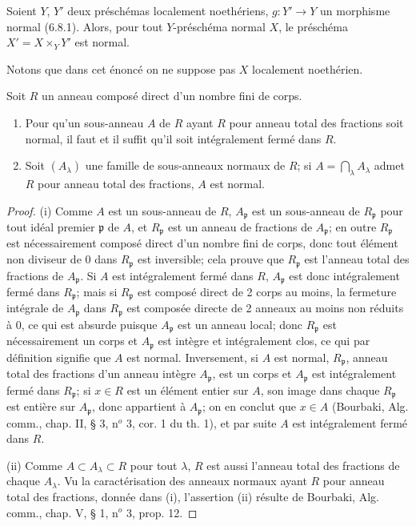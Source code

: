 \begin{proposition}[6.14.1]
\label{IV.2.s6.14.1-fr}
Soient $Y$, $Y'$ deux préschémas localement noethériens,
$g:Y'\to Y$ un morphisme normal (6.8.1). Alors, pour tout $Y$-préschéma
normal $X$, le préschéma $X'=X\times_Y Y'$ est normal.
\end{proposition}

Notons que dans cet énoncé on ne suppose pas $X$ localement noethérien.

\begin{lemma}[6.14.1.1]
\label{IV.2.s6.14.1.1-fr}
Soit $R$ un anneau composé direct d'un nombre fini de corps.
\begin{enumerate}
\item[(i)] Pour qu'un sous-anneau $A$ de $R$ ayant $R$ pour anneau total
des fractions soit normal, il faut et il suffit qu'il soit intégralement
fermé dans $R$.
\item[(ii)] Soit $(A_\lambda)$ une famille de sous-anneaux normaux de $R$;
si $A=\bigcap_\lambda A_\lambda$ admet $R$ pour anneau total des fractions,
$A$ est normal.
\end{enumerate}
\end{lemma}

\begin{proof}
(i) Comme $A$ est un sous-anneau de $R$, $A_\mathfrak p$ est un sous-anneau
de $R_\mathfrak p$ pour tout idéal premier $\mathfrak p$ de $A$, et
$R_\mathfrak p$ est un anneau de fractions de $A_\mathfrak p$; en outre
$R_\mathfrak p$ est nécessairement composé direct d'un nombre fini de
corps, donc tout élément non diviseur de $0$ dans $R_\mathfrak p$ est
inversible; cela prouve que $R_\mathfrak p$ est l'anneau total des fractions
de $A_\mathfrak p$. Si $A$ est intégralement fermé dans $R$,
$A_\mathfrak p$ est donc intégralement fermé dans $R_\mathfrak p$; mais si
$R_\mathfrak p$ est composé direct de 2 corps au moins, la fermeture
intégrale de $A_\mathfrak p$ dans $R_\mathfrak p$ est composée directe de
2 anneaux au moins non réduits à $0$, ce qui est absurde puisque
$A_\mathfrak p$ est un anneau local; donc $R_\mathfrak p$ est
nécessairement un corps et $A_\mathfrak p$ est intègre et intégralement clos,
ce qui par définition signifie que $A$ est normal. Inversement, si $A$ est
normal, $R_\mathfrak p$, anneau total des fractions d'un anneau intègre
$A_\mathfrak p$, est un corps et $A_\mathfrak p$ est intégralement fermé
dans $R_\mathfrak p$; si $x\in R$ est un élément entier sur $A$, son image
dans chaque $R_\mathfrak p$ est entière sur $A_\mathfrak p$, donc appartient
à $A_\mathfrak p$; on en conclut que $x\in A$ (Bourbaki, Alg. comm., chap.
II, § 3, n$^o$ 3, cor. 1 du th. 1), et par suite $A$ est intégralement fermé
dans $R$.

(ii) Comme $A\subset A_\lambda\subset R$ pour tout $\lambda$, $R$ est aussi
l'anneau total des fractions de chaque $A_\lambda$. Vu la caractérisation
des anneaux normaux ayant $R$ pour anneau total des fractions, donnée dans
(i), l'assertion (ii) résulte de Bourbaki, Alg. comm., chap. V, § 1, n$^o$
3, prop. 12.
\end{proof}

